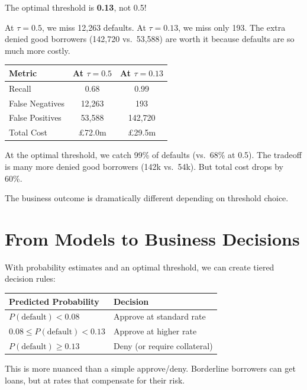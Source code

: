 \documentclass[11pt,a4paper]{article}
\begin{document}
The optimal threshold is \textbf{0.13}, not 0.5!

At $\tau = 0.5$, we miss 12,263 defaults. At $\tau = 0.13$, we miss only 193. The extra denied good borrowers (142,720 vs.\ 53,588) are worth it because defaults are so much more costly.

\begin{center}
\begin{tabular}{lcc}
\toprule
\textbf{Metric} & \textbf{At $\tau = 0.5$} & \textbf{At $\tau = 0.13$} \\
\midrule
Recall & 0.68 & 0.99 \\
False Negatives & 12,263 & 193 \\
False Positives & 53,588 & 142,720 \\
Total Cost & £72.0m & £29.5m \\
\bottomrule
\end{tabular}
\end{center}

At the optimal threshold, we catch 99\% of defaults (vs.\ 68\% at 0.5). The tradeoff is many more denied good borrowers (142k vs.\ 54k). But total cost drops by 60\%.

The business outcome is dramatically different depending on threshold choice.

\section{From Models to Business Decisions}

With probability estimates and an optimal threshold, we can create tiered decision rules:

\begin{center}
\begin{tabular}{ll}
\toprule
\textbf{Predicted Probability} & \textbf{Decision} \\
\midrule
$P(\text{default}) < 0.08$ & Approve at standard rate \\
$0.08 \leq P(\text{default}) < 0.13$ & Approve at higher rate \\
$P(\text{default}) \geq 0.13$ & Deny (or require collateral) \\
\bottomrule
\end{tabular}
\end{center}

This is more nuanced than a simple approve/deny. Borderline borrowers can get loans, but at rates that compensate for their risk.
\end{document}
